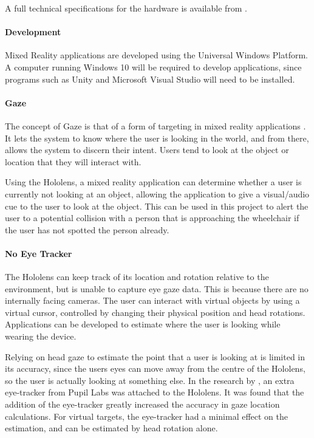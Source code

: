 \documentclass[12pt,a4paper]{report}
\begin{document}
A full technical specifications for the hardware is available from \cite{Microsoft2015}.

\paragraph{Development}
Mixed Reality applications are developed using the Universal Windows Platform. A computer running Windows 10 will be required to develop applications, since programs such as Unity and Microsoft Visual Studio will need to be installed.

\paragraph{Gaze}
The concept of Gaze is that of a form of targeting in mixed reality applications \citep{Microsoft}. It lets the system to know where the user is looking in the world, and from there, allows the system to discern their intent. Users tend to look at the object or location that they will interact with.

Using the Hololens, a mixed reality application can determine whether a user is currently not looking at an object, allowing the application to give a visual/audio cue to the user to look at the object. This can be used in this project to alert the user to a potential collision with a  person that is approaching the wheelchair if the user has not spotted the person already.


\paragraph{No Eye Tracker}
The Hololens can keep track of its location and rotation relative to the environment, but is unable to capture eye gaze data. This is because there are no internally facing cameras. The user can interact with virtual objects by using a virtual cursor, controlled by changing their physical position and head rotations. Applications can be developed to estimate where the user is looking while wearing the device. 

Relying on head gaze to estimate the point that a user is looking at is limited in its accuracy, since the users eyes can move away from the centre of the Hololens, so the user is actually looking at something else. In the research by \cite{VanderMeulen2017}, an extra eye-tracker from Pupil Labs was attached to the Hololens. It was found that the addition of the eye-tracker greatly increased the accuracy in gaze location calculations. For virtual targets, the eye-tracker had a minimal effect on the estimation, and can be estimated by head rotation alone.
\end{document}
